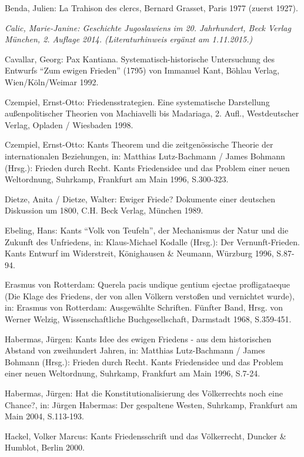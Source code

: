 \documentclass[12pt,a4paper,ngerman]{article}
\begin{document}
{\small

\setlength{\parindent}{0ex} \setlength{\parskip}{1.5ex}

Benda, Julien: La Trahison des clercs, Bernard Grasset, Paris 1977
(zuerst 1927).

{\em Calic, Marie-Janine: Geschichte
  Jugoslawiens im 20. Jahrhundert, Beck Verlag München, 2. Auflage
  2014. (Literaturhinweis ergänzt am 1.11.2015.)}

Cavallar, Georg: Pax Kantiana. Systematisch-historische
Untersuchung des Entwurfs "`Zum ewigen Frieden"' (1795) von Immanuel
Kant, Böhlau Verlag, Wien/Köln/Weimar 1992.

Czempiel, Ernst-Otto: Friedensstrategien. Eine systematische
Darstellung außenpolitischer Theorien von Machiavelli bis Madariaga,
2. Aufl., Westdeutscher Verlag, Opladen / Wiesbaden 1998.

Czempiel, Ernst-Otto: Kants Theorem und die zeitgenössische
Theorie der internationalen Beziehungen, in: Matthias Lutz-Bachmann /
James Bohmann (Hrsg.): Frieden durch Recht. Kants Friedensidee und das
Problem einer neuen Weltordnung, Suhrkamp, Frankfurt am Main 1996,
S.300-323.

Dietze, Anita / Dietze, Walter: Ewiger Friede? Dokumente einer
deutschen Diskussion um 1800, C.H. Beck Verlag, München 1989.

Ebeling, Hans: Kants "`Volk von Teufeln"', der Mechanismus der
Natur und die Zukunft des Unfriedens, in: Klaus-Michael Kodalle
(Hrsg.): Der Vernunft-Frieden.  Kants Entwurf im Widerstreit,
Könighausen \& Neumann, Würzburg 1996, S.87-94.

Erasmus von Rotterdam: Querela pacis undique gentium ejectae
profligataeque (Die Klage des Friedens, der von allen Völkern
verstoßen und vernichtet wurde), in: Erasmus von Rotterdam:
Ausgewählte Schriften. Fünfter Band, Hrsg.  von Werner Welzig,
Wissenschaftliche Buchgesellschaft, Darmstadt 1968, S.359-451.

Habermas, Jürgen: Kants Idee des ewigen Friedens - aus dem
historischen Abstand von zweihundert Jahren, in: Matthias
Lutz-Bachmann / James Bohmann (Hrsg.): Frieden durch Recht. Kants
Friedensidee und das Problem einer neuen Weltordnung, Suhrkamp,
Frankfurt am Main 1996, S.7-24.

Habermas, Jürgen: Hat die Konstitutionalisierung des Völkerrechts noch
eine Chance?, in: Jürgen Habermas: Der gespaltene Westen, Suhrkamp,
Frankfurt am Main 2004, S.113-193.

Hackel, Volker Marcus: Kants Friedensschrift und das
Völkerrecht, Duncker \& Humblot, Berlin 2000.

}
\end{document}
